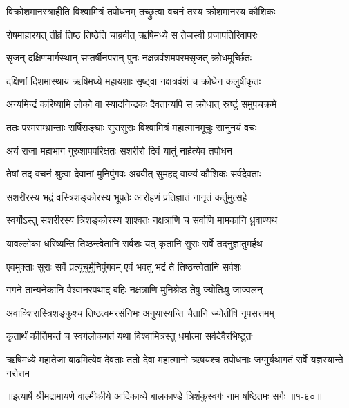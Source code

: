 \twolineshloka
{विक्रोशमानस्त्राहीति विश्वामित्रं तपोधनम्}
{तच्छ्रुत्वा वचनं तस्य क्रोशमानस्य कौशिकः} %

\twolineshloka
{रोषमाहारयत् तीव्रं तिष्ठ तिष्ठेति चाब्रवीत्}
{ऋषिमध्ये स तेजस्वी प्रजापतिरिवापरः} %

\twolineshloka
{सृजन् दक्षिणमार्गस्थान् सप्तर्षीनपरान् पुनः}
{नक्षत्रवंशमपरमसृजत् क्रोधमूर्च्छितः} %

\twolineshloka
{दक्षिणां दिशमास्थाय ऋषिमध्ये महायशाः}
{सृष्ट्वा नक्षत्रवंशं च क्रोधेन कलुषीकृतः} %

\twolineshloka
{अन्यमिन्द्रं करिष्यामि लोको वा स्यादनिन्द्रकः}
{दैवतान्यपि स क्रोधात् स्रष्टुं समुपचक्रमे} %

\twolineshloka
{ततः परमसम्भ्रान्ताः सर्षिसङ्घाः सुरासुराः}
{विश्वामित्रं महात्मानमूचुः सानुनयं वचः} %

\twolineshloka
{अयं राजा महाभाग गुरुशापपरिक्षतः}
{सशरीरो दिवं यातुं नार्हत्येव तपोधन} %

\twolineshloka
{तेषां तद् वचनं श्रुत्वा देवानां मुनिपुंगवः}
{अब्रवीत् सुमहद् वाक्यं कौशिकः सर्वदेवताः} %

\twolineshloka
{सशरीरस्य भद्रं वस्त्रिशङ्कोरस्य भूपतेः}
{आरोहणं प्रतिज्ञातं नानृतं कर्तुमुत्सहे} %

\twolineshloka
{स्वर्गोऽस्तु सशरीरस्य त्रिशङ्कोरस्य शाश्वतः}
{नक्षत्राणि च सर्वाणि मामकानि ध्रुवाण्यथ} %

\twolineshloka
{यावल्लोका धरिष्यन्ति तिष्ठन्त्वेतानि सर्वशः}
{यत् कृतानि सुराः सर्वे तदनुज्ञातुमर्हथ} %

\twolineshloka
{एवमुक्ताः सुराः सर्वे प्रत्यूचुर्मुनिपुंगवम्}
{एवं भवतु भद्रं ते तिष्ठन्त्वेतानि सर्वशः} %

\twolineshloka
{गगने तान्यनेकानि वैश्वानरपथाद् बहिः}
{नक्षत्राणि मुनिश्रेष्ठ तेषु ज्योतिःषु जाज्वलन्} %

\twolineshloka
{अवाक्शिरास्त्रिशङ्कुश्च तिष्ठत्वमरसंनिभः}
{अनुयास्यन्ति चैतानि ज्योतींषि नृपसत्तमम्} %

\twolineshloka
{कृतार्थं कीर्तिमन्तं च स्वर्गलोकगतं यथा}
{विश्वामित्रस्तु धर्मात्मा सर्वदेवैरभिष्टुतः} %

\threelineshloka
{ऋषिमध्ये महातेजा बाढमित्येव देवताः}
{ततो देवा महात्मानो ऋषयश्च तपोधनाः}
{जग्मुर्यथागतं सर्वे यज्ञस्यान्ते नरोत्तम} %


॥इत्यार्षे श्रीमद्रामायणे वाल्मीकीये आदिकाव्ये बालकाण्डे त्रिशंकुस्वर्गः नाम षष्ठितमः सर्गः ॥१-६०॥
